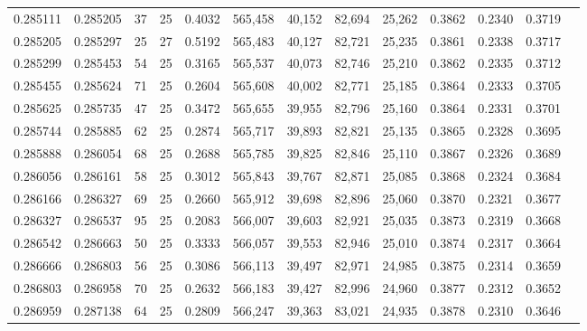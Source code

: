 \begin{tabular}{rrrrrrrrrrrrr}
0.285111 & 0.285205 &    37 &  25 &                                     0.4032 & 565,458 &  40,152 &  82,694 &  25,262 & 0.3862 & 0.2340 & 0.3719 \\
0.285205 & 0.285297 &    25 &  27 &                                     0.5192 & 565,483 &  40,127 &  82,721 &  25,235 & 0.3861 & 0.2338 & 0.3717 \\
0.285299 & 0.285453 &    54 &  25 &                                     0.3165 & 565,537 &  40,073 &  82,746 &  25,210 & 0.3862 & 0.2335 & 0.3712 \\
0.285455 & 0.285624 &    71 &  25 &                                     0.2604 & 565,608 &  40,002 &  82,771 &  25,185 & 0.3864 & 0.2333 & 0.3705 \\
0.285625 & 0.285735 &    47 &  25 &                                     0.3472 & 565,655 &  39,955 &  82,796 &  25,160 & 0.3864 & 0.2331 & 0.3701 \\
0.285744 & 0.285885 &    62 &  25 &                                     0.2874 & 565,717 &  39,893 &  82,821 &  25,135 & 0.3865 & 0.2328 & 0.3695 \\
0.285888 & 0.286054 &    68 &  25 &                                     0.2688 & 565,785 &  39,825 &  82,846 &  25,110 & 0.3867 & 0.2326 & 0.3689 \\
0.286056 & 0.286161 &    58 &  25 &                                     0.3012 & 565,843 &  39,767 &  82,871 &  25,085 & 0.3868 & 0.2324 & 0.3684 \\
0.286166 & 0.286327 &    69 &  25 &                                     0.2660 & 565,912 &  39,698 &  82,896 &  25,060 & 0.3870 & 0.2321 & 0.3677 \\
0.286327 & 0.286537 &    95 &  25 &                                     0.2083 & 566,007 &  39,603 &  82,921 &  25,035 & 0.3873 & 0.2319 & 0.3668 \\
0.286542 & 0.286663 &    50 &  25 &                                     0.3333 & 566,057 &  39,553 &  82,946 &  25,010 & 0.3874 & 0.2317 & 0.3664 \\
0.286666 & 0.286803 &    56 &  25 &                                     0.3086 & 566,113 &  39,497 &  82,971 &  24,985 & 0.3875 & 0.2314 & 0.3659 \\
0.286803 & 0.286958 &    70 &  25 &                                     0.2632 & 566,183 &  39,427 &  82,996 &  24,960 & 0.3877 & 0.2312 & 0.3652 \\
0.286959 & 0.287138 &    64 &  25 &                                     0.2809 & 566,247 &  39,363 &  83,021 &  24,935 & 0.3878 & 0.2310 & 0.3646 \\

\end{tabular}
